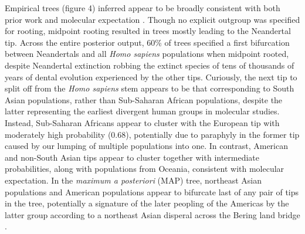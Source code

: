 \documentclass[12pt, twocolumn, twoside]{article}
\begin{document}
Empirical trees (figure 4) inferred appear to be broadly consistent with both prior work \citep{scottAnthropologyModernHuman2018} and molecular expectation \citep{mallickSimonsGenomeDiversity2016}. Though no explicit outgroup was specified for rooting, midpoint rooting resulted in trees mostly leading to the Neandertal tip. Across the entire posterior output, 60\% of trees specified a first bifurcation between Neandertals and all \textit{Homo sapiens} populations when midpoint rooted, despite Neandertal extinction robbing the extinct species of tens of thousands of years of dental evolution experienced by the other tips. Curiously, the next tip to split off from the \textit{Homo sapiens} stem appears to be that corresponding to South Asian populations, rather than Sub-Saharan African populations, despite the latter representing the earliest divergent human groups in molecular studies. Instead, Sub-Saharan Africans appear to cluster with the European tip with moderately high probability (0.68), potentially due to paraphyly in the former tip caused by our lumping of multiple populations into one. In contrast, American and non-South Asian tips appear to cluster together with intermediate probabilities, along with populations from Oceania, consistent with molecular expectation. In the \textit{maximum a posteriori} (MAP) tree, northeast Asian populations and American populations appear to bifurcate last of any pair of tips in the tree, potentially a signature of the later peopling of the Americas by the latter group according to a northeast Asian disperal across the Bering land bridge \citep{mulliganPeoplingAmericasOrigin2017}.
\end{document}
